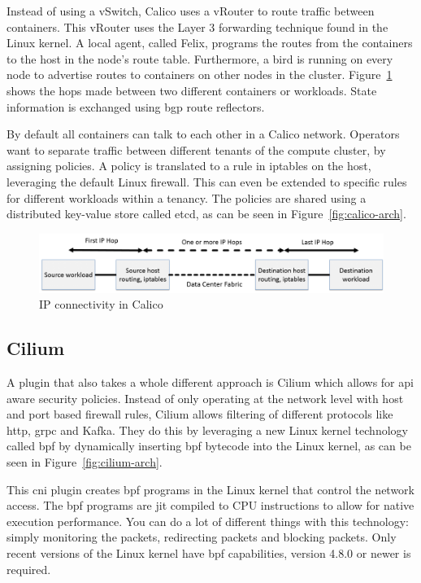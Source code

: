 Instead of using a vSwitch, Calico uses a vRouter to route traffic between containers. This vRouter uses the Layer 3 forwarding technique found in the Linux kernel. A local agent, called Felix, programs the routes from the containers to the host in the node's route table. Furthermore, a \gls{bird} is running on every node to advertise routes to containers on other nodes in the cluster. Figure~\ref{fig:hops} shows the hops made between two different containers or workloads. State information is exchanged using \gls{bgp} route reflectors.

By default all containers can talk to each other in a Calico network. Operators want to separate traffic between different tenants of the compute cluster, by assigning policies. A policy is translated to a rule in iptables\cite{iptables} on the host, leveraging the default Linux firewall. This can even be extended to specific rules for different workloads within a tenancy. The policies are shared using a distributed key-value store called etcd\cite{etcd}, as can be seen in Figure~\ref{fig:calico-arch}.

\begin{figure}
    \centering
    \includegraphics[width=1\columnwidth]{images/calico-hops}
    \caption{IP connectivity in Calico\cite{calico_learn}}
    \label{fig:hops}
\end{figure}

\subsection{Cilium}
\label{subsec:cilium}
A plugin that also takes a whole different approach is Cilium\cite{cilium} which allows for \gls{api} aware security policies. Instead of only operating at the network level with host and port based firewall rules, Cilium allows filtering of different protocols like \gls{http}, \gls{grpc}\cite{grpc} and Kafka\cite{kafka}. They do this by leveraging a new Linux kernel technology called \gls{bpf}\cite{mccanne1993bsd, cilium_bpf} by dynamically inserting \gls{bpf} bytecode into the Linux kernel, as can be seen in Figure~\ref{fig:cilium-arch}. 

This \gls{cni} plugin creates \gls{bpf} programs in the Linux kernel that control the network access. The \gls{bpf} programs are \gls{jit} compiled to CPU instructions to allow for native execution performance. You can do a lot of different things with this technology: simply monitoring the packets, redirecting packets and blocking packets. Only recent versions of the Linux kernel have \gls{bpf} capabilities, version 4.8.0 or newer is required. 

